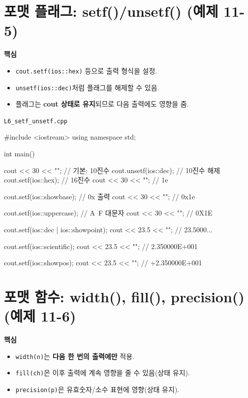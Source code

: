 \documentclass[11pt,a4paper]{article}
\newcommand{\filetag}[1]{\texttt{\color{Accent}#1}}
\begin{document}
\section{포맷 플래그: setf()/unsetf() (예제 11-5)}
\begin{GoalBox}
\textbf{핵심}
\begin{itemize}[leftmargin=18pt]
  \item \texttt{cout.setf(ios::hex)} 등으로 출력 형식을 설정. %
  \item \texttt{unsetf(ios::dec)}처럼 플래그를 해제할 수 있음.
  \item 플래그는 \textbf{cout 상태로 유지}되므로 다음 출력에도 영향을 줌.
\end{itemize}
\end{GoalBox}

\noindent\filetag{L6\_setf\_unsetf.cpp}
\begin{cppcode}
#include <iostream>
using namespace std;

int main() {
    cout << 30 << "\n";            // 기본: 10진수
    cout.unsetf(ios::dec);         // 10진수 해제
    cout.setf(ios::hex);           // 16진수
    cout << 30 << "\n";            // 1e

    cout.setf(ios::showbase);      // 0x 출력
    cout << 30 << "\n";            // 0x1e

    cout.setf(ios::uppercase);     // A~F 대문자
    cout << 30 << "\n";            // 0X1E

    cout.setf(ios::dec | ios::showpoint);
    cout << 23.5 << "\n";          // 23.5000...

    cout.setf(ios::scientific);
    cout << 23.5 << "\n";          // 2.350000E+001

    cout.setf(ios::showpos);
    cout << 23.5 << "\n";          // +2.350000E+001
}
\end{cppcode}

\section{포맷 함수: width(), fill(), precision() (예제 11-6)}
\begin{GoalBox}
\textbf{핵심}
\begin{itemize}[leftmargin=18pt]
  \item \texttt{width(n)}는 \textbf{다음 한 번의 출력에만} 적용.
  \item \texttt{fill(ch)}은 이후 출력에 계속 영향을 줄 수 있음(상태 유지).
  \item \texttt{precision(p)}은 유효숫자/소수 표현에 영향(상태 유지). %
\end{itemize}
\end{GoalBox}
\end{document}
